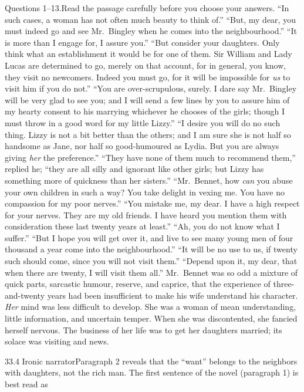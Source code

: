 \documentclass[11pt]{article}
\begin{document}
\begin{passage}{Questions 1--13.\quad Read the passage carefully before you choose your answers.}
\pp ``In such cases, a woman has not often much beauty to think of.''
\pp ``But, my dear, you must indeed go and see Mr.\ Bingley when he comes into the neighbourhood.''
\pp ``It is more than I engage for, I assure you.''
\pp ``But consider your daughters. Only think what an establishment it would be for one of them. Sir William and Lady Lucas are determined to go, merely on that account, for in general, you know, they visit no newcomers. Indeed you must go, for it will be impossible for \emph{us} to visit him if you do not.''
\pp ``You are over-scrupulous, surely. I dare say Mr.\ Bingley will be very glad to see you; and I will send a few lines by you to assure him of my hearty consent to his marrying whichever he chooses of the girls; though I must throw in a good word for my little Lizzy.''
\pp ``I desire you will do no such thing. Lizzy is not a bit better than the others; and I am sure she is not half so handsome as Jane, nor half so good-humoured as Lydia. But you are always giving \emph{her} the preference.''
\pp ``They have none of them much to recommend them,'' replied he; ``they are all silly and ignorant like other girls; but Lizzy has something more of quickness than her sisters.''
\pp ``Mr.\ Bennet, how \emph{can} you abuse your own children in such a way? You take delight in vexing me. You have no compassion for my poor nerves.''
\pp ``You mistake me, my dear. I have a high respect for your nerves. They are my old friends. I have heard you mention them with consideration these last twenty years at least.''
\pp ``Ah, you do not know what I suffer.''
\pp ``But I hope you will get over it, and live to see many young men of four thousand a year come into the neighbourhood.''
\pp ``It will be no use to us, if twenty such should come, since you will not visit them.''
\pp ``Depend upon it, my dear, that when there are twenty, I will visit them all.''
\pp Mr.\ Bennet was so odd a mixture of quick parts, sarcastic humour, reserve, and caprice, that the experience of three-and-twenty years had been insufficient to make his wife understand his character. \emph{Her} mind was less difficult to develop. She was a woman of mean understanding, little information, and uncertain temper. When she was discontented, she fancied herself nervous. The business of her life was to get her daughters married; its solace was visiting and news.
\end{passage}

\begin{q}{3}{3.4 Ironic narrator}{Paragraph 2 reveals that the ``want'' belongs to the neighbors with daughters, not the rich man.}
The first sentence of the novel (paragraph 1) is best read as
\end{q}
\end{document}
